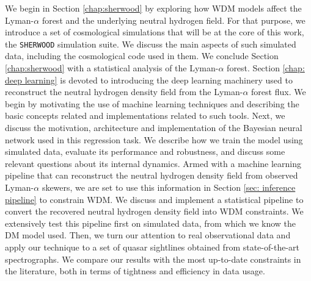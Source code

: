 We begin in Section \ref{chap:sherwood} by exploring how WDM models affect the Lyman-$\alpha$ forest and the underlying neutral hydrogen field. For that purpose, we introduce a set of cosmological simulations that will be at the core of this work, the \texttt{SHERWOOD} simulation suite. We discuss the main aspects of such simulated data, including the cosmological code used in them. We conclude Section \ref{chap:sherwood} with a statistical analysis of the Lyman-$\alpha$ forest. Section \ref{chap: deep learning} is devoted to introducing the deep learning machinery used to reconstruct the neutral hydrogen density field from the Lyman-$\alpha$ forest flux. We begin by motivating the use of machine learning techniques and describing the basic concepts related and implementations related to such tools. Next, we discuss the motivation, architecture and implementation of the Bayesian neural network used in this regression task. We describe how we train the model using simulated data, evaluate its performance and robustness, and discuss some relevant questions about its internal dynamics. Armed with a machine learning pipeline that can reconstruct the neutral hydrogen density field from observed Lyman-$\alpha$ skewers, we are set to use this information in Section \ref{sec: inference pipeline} to constrain WDM. We discuss and implement a statistical pipeline to convert the recovered neutral hydrogen density field into WDM constraints. We extensively test this pipeline first on simulated data, from which we know the DM model used. Then, we turn our attention to real observational data and apply our technique to a set of quasar sightlines obtained from state-of-the-art spectrographs. We compare our results with the most up-to-date constraints in the literature, both in terms of tightness and efficiency in data usage.
